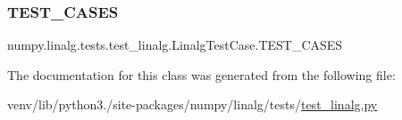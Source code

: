 \subsubsection{\texorpdfstring{T\+E\+S\+T\+\_\+\+C\+A\+S\+ES}{TEST\_CASES}}
{\footnotesize\ttfamily numpy.\+linalg.\+tests.\+test\+\_\+linalg.\+Linalg\+Test\+Case.\+T\+E\+S\+T\+\_\+\+C\+A\+S\+ES\hspace{0.3cm}{\ttfamily [static]}}



The documentation for this class was generated from the following file\+:\begin{DoxyCompactItemize}
\item 
venv/lib/python3./site-\/packages/numpy/linalg/tests/\hyperlink{test__linalg_8py}{test\+\_\+linalg.\+py}\end{DoxyCompactItemize}
